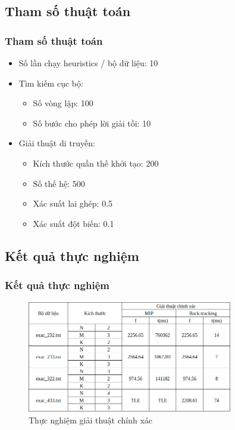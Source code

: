 \documentclass{beamer}
\begin{document}
	\subsection{Tham số thuật toán}
	\begin{frame}
	\frametitle{Tham số thuật toán}
		\begin{itemize}
			\item Số lần chạy heuristics / bộ dữ liệu: 10
			\item {
				Tìm kiếm cục bộ:
				\begin{itemize}
					\item Số vòng lặp: 100
					\item Số bước cho phép lời giải tồi: 10
				\end{itemize}
			}
			\item {
				Giải thuật di truyền:
				\begin{itemize}
					\item Kích thước quần thế khởi tạo: 200
					\item Số thế hệ: 500
					\item Xác suất lai ghép: 0.5
					\item Xác suất đột biến: 0.1
				\end{itemize}
			}
		\end{itemize}
	\end{frame}

	\subsection{Kết quả thực nghiệm}
	\begin{frame}
		\frametitle{Kết quả thực nghiệm}
		\begin{figure}
			\centering
			\caption{Thực nghiệm giải thuật chính xác}
			\includegraphics[width=0.8\textwidth]{images/exac.png}
		\end{figure}
	\end{frame}
\end{document}
